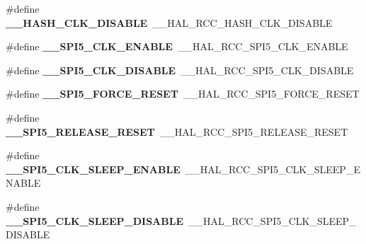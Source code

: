 \begin{DoxyCompactItemize}
\item 
\#define {\bfseries \+\_\+\+\_\+\+H\+A\+S\+H\+\_\+\+C\+L\+K\+\_\+\+D\+I\+S\+A\+B\+LE}~\+\_\+\+\_\+\+H\+A\+L\+\_\+\+R\+C\+C\+\_\+\+H\+A\+S\+H\+\_\+\+C\+L\+K\+\_\+\+D\+I\+S\+A\+B\+LE\hypertarget{group___h_a_l___r_c_c___aliased_gab3f5c7465d76625b7f6150aceec5780e}{}\label{group___h_a_l___r_c_c___aliased_gab3f5c7465d76625b7f6150aceec5780e}

\item 
\#define {\bfseries \+\_\+\+\_\+\+S\+P\+I5\+\_\+\+C\+L\+K\+\_\+\+E\+N\+A\+B\+LE}~\+\_\+\+\_\+\+H\+A\+L\+\_\+\+R\+C\+C\+\_\+\+S\+P\+I5\+\_\+\+C\+L\+K\+\_\+\+E\+N\+A\+B\+LE\hypertarget{group___h_a_l___r_c_c___aliased_gab2da9ccd3f940c93df709920900fba25}{}\label{group___h_a_l___r_c_c___aliased_gab2da9ccd3f940c93df709920900fba25}

\item 
\#define {\bfseries \+\_\+\+\_\+\+S\+P\+I5\+\_\+\+C\+L\+K\+\_\+\+D\+I\+S\+A\+B\+LE}~\+\_\+\+\_\+\+H\+A\+L\+\_\+\+R\+C\+C\+\_\+\+S\+P\+I5\+\_\+\+C\+L\+K\+\_\+\+D\+I\+S\+A\+B\+LE\hypertarget{group___h_a_l___r_c_c___aliased_ga5b165d3539afb51e2e05bd2de0749ae3}{}\label{group___h_a_l___r_c_c___aliased_ga5b165d3539afb51e2e05bd2de0749ae3}

\item 
\#define {\bfseries \+\_\+\+\_\+\+S\+P\+I5\+\_\+\+F\+O\+R\+C\+E\+\_\+\+R\+E\+S\+ET}~\+\_\+\+\_\+\+H\+A\+L\+\_\+\+R\+C\+C\+\_\+\+S\+P\+I5\+\_\+\+F\+O\+R\+C\+E\+\_\+\+R\+E\+S\+ET\hypertarget{group___h_a_l___r_c_c___aliased_ga58137bdc1c2d10e75f0da96c677e8ead}{}\label{group___h_a_l___r_c_c___aliased_ga58137bdc1c2d10e75f0da96c677e8ead}

\item 
\#define {\bfseries \+\_\+\+\_\+\+S\+P\+I5\+\_\+\+R\+E\+L\+E\+A\+S\+E\+\_\+\+R\+E\+S\+ET}~\+\_\+\+\_\+\+H\+A\+L\+\_\+\+R\+C\+C\+\_\+\+S\+P\+I5\+\_\+\+R\+E\+L\+E\+A\+S\+E\+\_\+\+R\+E\+S\+ET\hypertarget{group___h_a_l___r_c_c___aliased_gabca42c543de06ceaad91178e82cc33de}{}\label{group___h_a_l___r_c_c___aliased_gabca42c543de06ceaad91178e82cc33de}

\item 
\#define {\bfseries \+\_\+\+\_\+\+S\+P\+I5\+\_\+\+C\+L\+K\+\_\+\+S\+L\+E\+E\+P\+\_\+\+E\+N\+A\+B\+LE}~\+\_\+\+\_\+\+H\+A\+L\+\_\+\+R\+C\+C\+\_\+\+S\+P\+I5\+\_\+\+C\+L\+K\+\_\+\+S\+L\+E\+E\+P\+\_\+\+E\+N\+A\+B\+LE\hypertarget{group___h_a_l___r_c_c___aliased_gabbaf71d9b0e2f5d88c3563747d53fc4b}{}\label{group___h_a_l___r_c_c___aliased_gabbaf71d9b0e2f5d88c3563747d53fc4b}

\item 
\#define {\bfseries \+\_\+\+\_\+\+S\+P\+I5\+\_\+\+C\+L\+K\+\_\+\+S\+L\+E\+E\+P\+\_\+\+D\+I\+S\+A\+B\+LE}~\+\_\+\+\_\+\+H\+A\+L\+\_\+\+R\+C\+C\+\_\+\+S\+P\+I5\+\_\+\+C\+L\+K\+\_\+\+S\+L\+E\+E\+P\+\_\+\+D\+I\+S\+A\+B\+LE\hypertarget{group___h_a_l___r_c_c___aliased_ga8ad5af0156ecf5b7fb04992a241103ed}{}\label{group___h_a_l___r_c_c___aliased_ga8ad5af0156ecf5b7fb04992a241103ed}


\end{DoxyCompactItemize}
